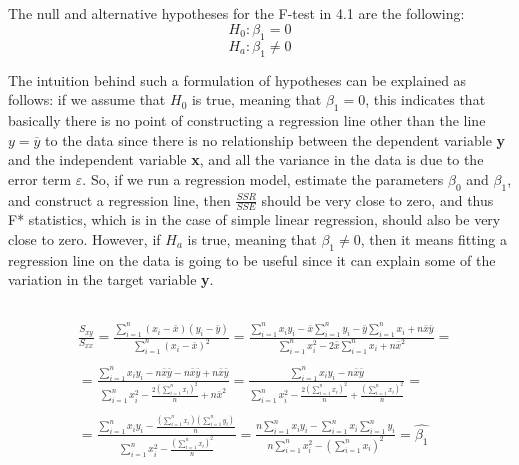 \documentclass{homework2_template}
\begin{document}
\subsection{}
The null and alternative hypotheses for the F-test in 4.1 are the following:
\[ H_0: \beta_1 = 0 \]
\[ H_a: \beta_1 \neq 0 \]

The intuition behind such a formulation of hypotheses can be explained as follows: if we assume that $H_0$ is true, meaning that $\beta_1 = 0$, this indicates that basically there is no point of constructing a regression line other than the line $y = \overline{y}$ to the data since there is no relationship between the dependent variable \textbf{y} and the independent variable \textbf{x}, and all the variance in the data is due to the error term $\varepsilon$. So, if we run a regression model, estimate the parameters $\beta_0$ and $\beta_1$, and construct a regression line, then $\frac{SSR}{SSE}$ should be very close to zero, and thus F* statistics, which is  in the case of simple linear regression, should also be very close to zero. However, if $H_a$ is true, meaning that $\beta_1 \neq 0$, then it means fitting a regression line on the data is going to be useful since it can explain some of the variation in the target variable \textbf{y}.

\subsection{}
{\large
\begin{equation*}
\begin{split}
& \frac{S_{xy}}{S_{xx}} = \frac{\sum_{i=1}^n(x_i-\bar{x})(y_i-\bar{y})}{\sum_{i=1}^n(x_i-\bar{x})^2} = \frac{\sum_{i=1}^n x_i y_i - \bar{x}\sum_{i=1}^n y_i - \bar{y}\sum_{i=1}^n x_i + n\bar{x} \bar{y}}{\sum_{i=1}^n x_i^2 - 2\bar{x}\sum_{i=1}^n x_i + n\bar{x}^2 } = \\
\\
& = \frac{\sum_{i=1}^n x_i y_i - n\bar{x}\bar{y} - n\bar{x}\bar{y} + n\bar{x} \bar{y}}{\sum_{i=1}^n x_i^2 - \frac{2(\sum_{i=1}^n x_i)^2}{n} + n\bar{x}^2} = \frac{\sum_{i=1}^n x_i y_i - n\bar{x}\bar{y}}{\sum_{i=1}^n x_i^2 - \frac{2(\sum_{i=1}^n x_i)^2}{n} + \frac{(\sum_{i=1}^n x_i)^2}{n}} = \\
\\
& =\frac{\sum_{i=1}^n x_i y_i - \frac{(\sum_{i=1}^n x_i)(\sum_{i=1}^n y_i)}{n}}{\sum_{i=1}^n x_i^2 - \frac{(\sum_{i=1}^n x_i)^2}{n}} = \frac{n\sum_{i=1}^n x_i y_i - \sum_{i=1}^n x_i\sum_{i=1}^n y_i}{n\sum_{i=1}^n x_i^2 - (\sum_{i=1}^n x_i)^2} = \hat{\beta_1}
\end{split}
\end{equation*}
}
\end{document}
